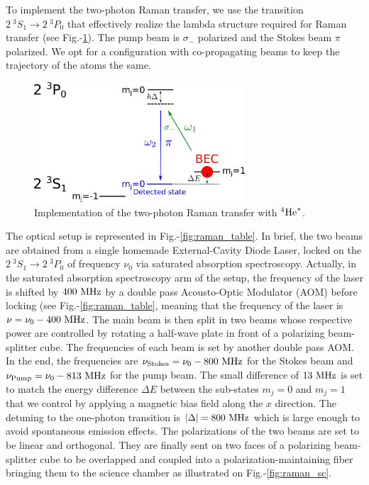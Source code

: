 To implement the two-photon Raman transfer, we use the transition $2 \ ^3 S_1 \rightarrow 2 \ ^3 P_0$ that effectively realize the lambda structure required for Raman transfer (see Fig.-\ref{fig:raman_He}). The pump beam is $\sigma_-$ polarized and the Stokes beam $\pi$ polarized. We opt for a configuration with co-propagating beams to keep the trajectory of the atoms the same.



\begin{figure}
    \centering
    \includegraphics[width=0.7\textwidth]{Fig/Chapter3/raman_exp.png}
    \caption{Implementation of the two-photon Raman transfer with $^4 \rm{He}^*$.}
    \label{fig:raman_He}
\end{figure}

The optical setup is represented in Fig.-\ref{fig:raman_table}. In brief, the two beams are obtained from a single homemade External-Cavity Diode Laser, locked on the $2 \ ^3 S_1 \rightarrow 2 \ ^3 P_0$ of frequency $\nu_0$ via saturated absorption spectroscopy. Actually, in the saturated absorption spectroscopy arm of the setup, the frequency of the laser is shifted by $400 \ \rm{MHz}$ by a double pass Acousto-Optic Modulator (AOM) before locking (see Fig.-\ref{fig:raman_table}, meaning that the frequency of the laser is $\nu = \nu_0 - 400 \ \rm{MHz}$. The main beam is then split in two beams whose respective power are controlled by rotating a half-wave plate in front of a polarizing beam-splitter cube. The frequencies of each beam is set by another double pass AOM. In the end, the frequencies are $\nu_{\rm{Stokes}} = \nu_0 - 800 \ \rm{MHz}$ for the Stokes beam and $\nu_{\rm{Pump}} = \nu_0 - 813 \ \rm{MHz}$ for the pump beam. The small difference of $13 \ \rm{MHz}$ is set to match the energy difference $\Delta E$ between the sub-states $m_j=0$ and $m_j=1$ that we control by applying a magnetic bias field along the $x$ direction. The detuning to the one-photon transition is $|\Delta|=800 \ \rm{MHz}$ which is large enough to avoid spontaneous emission effects. The polarizations of the two beams are set to be linear and orthogonal. They are finally sent on two faces of a polarizing beam-splitter cube to be overlapped and coupled into a polarization-maintaining fiber bringing them to the science chamber as illustrated on Fig.-\ref{fig:raman_sc}.

